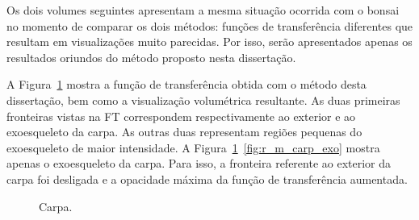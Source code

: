 \clearpage
	Os dois volumes seguintes apresentam a mesma situação ocorrida com o bonsai no momento de comparar os dois métodos: funções de transferência diferentes que resultam em visualizações muito parecidas. Por isso, serão apresentados apenas os resultados oriundos do método proposto nesta dissertação.
	
	A Figura~\ref{fig:r_m_carp} mostra a função de transferência obtida com o método desta dissertação, bem como a visualização volumétrica resultante. As duas primeiras fronteiras vistas na FT correspondem respectivamente ao exterior e ao exoesqueleto da carpa. As outras duas representam regiões pequenas do exoesqueleto de maior intensidade. A Figura~\ref{fig:r_m_carp}~\ref{fig:r_m_carp_exo} mostra apenas o exoesqueleto da carpa. Para isso, a fronteira referente ao exterior da carpa foi desligada e a opacidade máxima da função de transferência aumentada.
	
\begin{figure}[h]
	\centering
	\caption{Carpa.}
	\label{fig:r_m_carp}
\end{figure}

